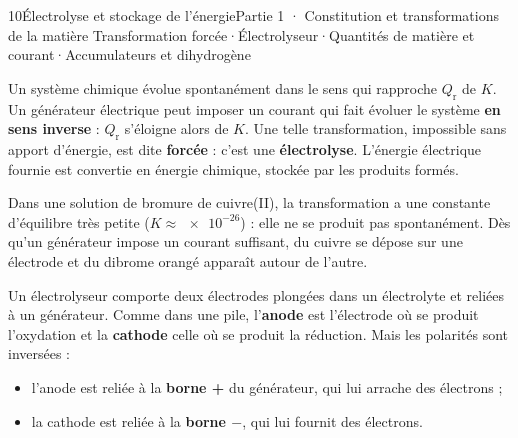 \begin{ouverture}[electrolyse]{10}{Électrolyse et stockage de l'énergie}{Partie 1 · Constitution et transformations de la matière}
{Transformation forcée\enspace·\enspace Électrolyseur\enspace·\enspace Quantités de matière et courant\enspace·\enspace Accumulateurs et dihydrogène}
\end{ouverture}
\essentiel
{}
\begin{definition}
Un système chimique évolue spontanément dans le sens qui rapproche $Q_\mathrm{r}$ de $K$. Un générateur électrique peut
imposer un courant qui fait évoluer le système \textbf{en sens inverse} : $Q_\mathrm{r}$ s'éloigne alors de $K$. Une telle
transformation, impossible sans apport d'énergie, est dite \textbf{forcée} : c'est une \textbf{électrolyse}. L'énergie
électrique fournie est convertie en énergie chimique, stockée par les produits formés.
\end{definition}
\begin{exemple}
Dans une solution de bromure de cuivre(II), la transformation  a une
constante d'équilibre très petite ($K\approx\num{e-26}$) : elle ne se produit pas spontanément. Dès qu'un générateur
impose un courant suffisant, du cuivre se dépose sur une électrode et du dibrome orangé apparaît autour de l'autre.
\end{exemple}
\begin{definition}
Un électrolyseur comporte deux électrodes plongées dans un électrolyte et reliées à un générateur. Comme dans une
pile, l'\textbf{anode} est l'électrode où se produit l'oxydation et la \textbf{cathode} celle où se produit la
réduction. Mais les polarités sont inversées :
\begin{itemize}[leftmargin=1.4em,itemsep=0.1em]
\item l'anode est reliée à la \textbf{borne +} du générateur, qui lui arrache des électrons ;
\item la cathode est reliée à la \textbf{borne $-$}, qui lui fournit des électrons.
\end{itemize}
\end{definition}
